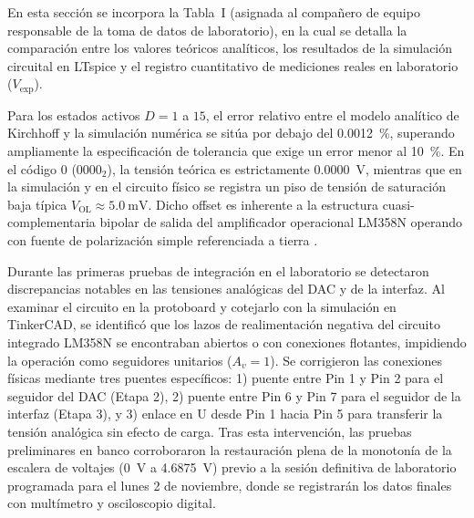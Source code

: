 \documentclass[journal,transmag]{IEEEtran}
\begin{document}
En esta sección se incorpora la Tabla~I (asignada al compañero de equipo responsable de la toma de datos de laboratorio), en la cual se detalla la comparación entre los valores teóricos analíticos, los resultados de la simulación circuital en LTspice y el registro cuantitativo de mediciones reales en laboratorio ($V_{\text{exp}}$).

Para los estados activos $D = 1$ a $15$, el error relativo entre el modelo analítico de Kirchhoff y la simulación numérica se sitúa por debajo del \SI{0.0012}{\percent}, superando ampliamente la especificación de tolerancia que exige un error menor al \SI{10}{\percent}. En el código 0 ($0000_2$), la tensión teórica es estrictamente \SI{0.0000}{\volt}, mientras que en la simulación y en el circuito físico se registra un piso de tensión de saturación baja típica $V_{\text{OL}} \approx \SI{5.0}{\milli\volt}$. Dicho offset es inherente a la estructura cuasi-complementaria bipolar de salida del amplificador operacional LM358N operando con fuente de polarización simple referenciada a tierra \cite{ti_lm358}.

Durante las primeras pruebas de integración en el laboratorio se detectaron discrepancias notables en las tensiones analógicas del DAC y de la interfaz. Al examinar el circuito en la protoboard y cotejarlo con la simulación en TinkerCAD, se identificó que los lazos de realimentación negativa del circuito integrado LM358N se encontraban abiertos o con conexiones flotantes, impidiendo la operación como seguidores unitarios ($A_v = 1$). Se corrigieron las conexiones físicas mediante tres puentes específicos: 1) puente entre Pin 1 y Pin 2 para el seguidor del DAC (Etapa 2), 2) puente entre Pin 6 y Pin 7 para el seguidor de la interfaz (Etapa 3), y 3) enlace en U desde Pin 1 hacia Pin 5 para transferir la tensión analógica sin efecto de carga. Tras esta intervención, las pruebas preliminares en banco corroboraron la restauración plena de la monotonía de la escalera de voltajes (\SI{0}{\volt} a \SI{4.6875}{\volt}) previo a la sesión definitiva de laboratorio programada para el lunes 2 de noviembre, donde se registrarán los datos finales con multímetro y osciloscopio digital.
\end{document}
